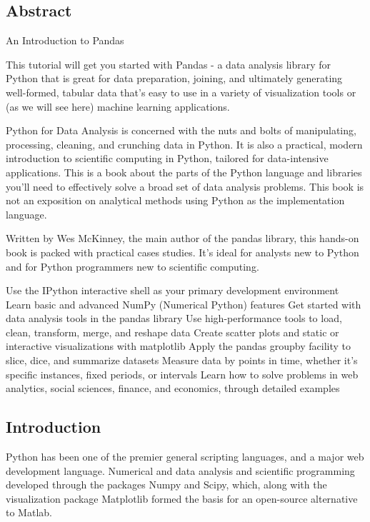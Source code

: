 
\subsection*{Abstract}
An Introduction to Pandas

This tutorial will get you started with Pandas - a data analysis library for Python that is great for data preparation, joining, and ultimately generating well-formed, tabular data that's easy to use in a variety of visualization tools or (as we will see here) machine learning applications. 

Python for Data Analysis is concerned with the nuts and bolts of manipulating, processing, cleaning, and crunching data in Python. It is also a practical, modern introduction to scientific computing in Python, tailored for data-intensive applications. This is a book about the parts of the Python language and libraries you’ll need to effectively solve a broad set of data analysis problems. This book is not an exposition on analytical methods using Python as the implementation language.

Written by Wes McKinney, the main author of the pandas library, this hands-on book is packed with practical cases studies. It’s ideal for analysts new to Python and for Python programmers new to scientific computing.

Use the IPython interactive shell as your primary development environment
Learn basic and advanced NumPy (Numerical Python) features
Get started with data analysis tools in the pandas library
Use high-performance tools to load, clean, transform, merge, and reshape data
Create scatter plots and static or interactive visualizations with matplotlib
Apply the pandas groupby facility to slice, dice, and summarize datasets
Measure data by points in time, whether it’s specific instances, fixed periods, or intervals
Learn how to solve problems in web analytics, social sciences, finance, and economics, through detailed examples

\subsection*{Introduction}

Python has been one of the premier general scripting languages, and a major web development language. 
Numerical and data analysis and scientific programming developed through the packages Numpy and Scipy, 
which, along with the visualization package Matplotlib formed the basis for an open-source alternative to Matlab. 

